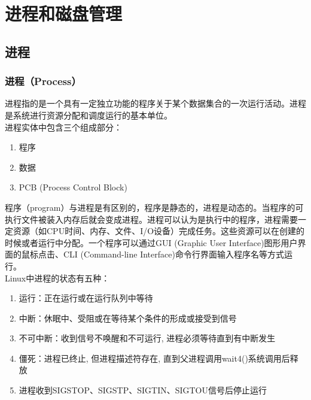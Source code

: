 \documentclass[12pt, openany, oneside]{book}
\begin{document}
\newpage

\chapter{进程和磁盘管理}

\section{进程}

\subsection{进程（Process）}

进程指的是一个具有一定独立功能的程序关于某个数据集合的一次运行活动。进程是系统进行资源分配和调度运行的基本单位。 \\

进程实体中包含三个组成部分：

\begin{enumerate}
	\item 程序
	\item 数据
	\item PCB (Process Control Block)
\end{enumerate}

程序（program）与进程是有区别的，程序是静态的，进程是动态的。当程序的可执行文件被装入内存后就会变成进程。进程可以认为是执行中的程序，进程需要一定资源（如CPU时间、内存、文件、I/O设备）完成任务。这些资源可以在创建的时候或者运行中分配。一个程序可以通过GUI (Graphic User Interface)图形用户界面的鼠标点击、CLI (Command-line Interface)命令行界面输入程序名等方式运行。 \\

Linux中进程的状态有五种：

\begin{enumerate}
	\item 运行：正在运行或在运行队列中等待

	\item 中断：休眠中、受阻或在等待某个条件的形成或接受到信号

	\item 不可中断：收到信号不唤醒和不可运行, 进程必须等待直到有中断发生

	\item 僵死：进程已终止, 但进程描述符存在, 直到父进程调用wait4()系统调用后释放

	\item 进程收到SIGSTOP、SIGSTP、SIGTIN、SIGTOU信号后停止运行
\end{enumerate}
\end{document}

